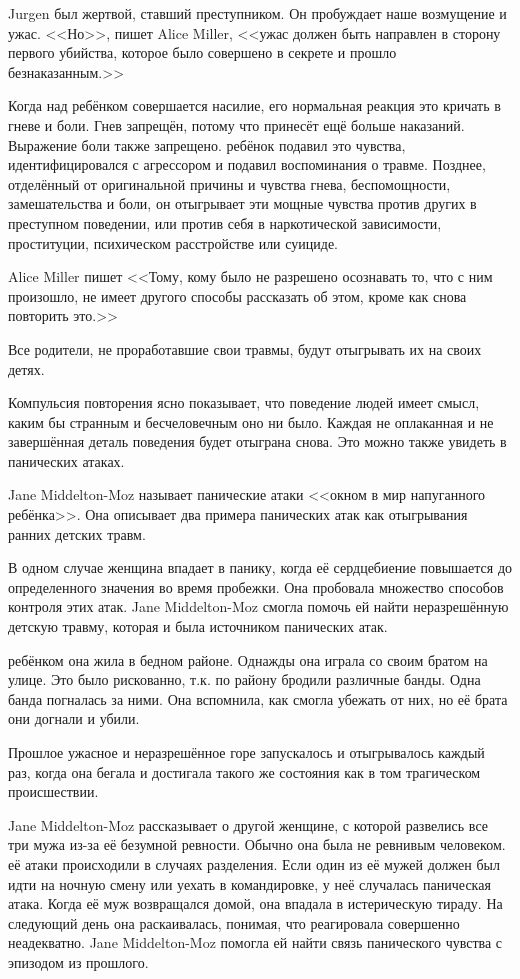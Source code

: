\documentclass[10pt, fleqn]{article}
\begin{document}
Jurgen был жертвой, ставший преступником. Он пробуждает наше возмущение и ужас. <<Но>>, пишет Alice Miller, <<ужас должен быть направлен в сторону первого убийства, которое было совершено в секрете и прошло безнаказанным.>>

Когда над ребёнком совершается насилие, его нормальная реакция это кричать в гневе и боли. Гнев запрещён, потому что принесёт ещё больше наказаний. Выражение боли также запрещено. ребёнок подавил это чувства, идентифицировался с агрессором и подавил воспоминания о травме. Позднее, отделённый от оригинальной причины и чувства гнева, беспомощности, замешательства и боли, он отыгрывает эти мощные чувства против других в преступном поведении, или против себя в наркотической зависимости, проституции, психическом расстройстве или суициде.

Alice Miller пишет <<Тому, кому было не разрешено осознавать то, что с ним произошло, не имеет другого способы рассказать об этом, кроме как снова повторить это.>>

Все родители, не проработавшие свои травмы, будут отыгрывать их на своих детях.


Компульсия повторения ясно показывает, что поведение людей имеет смысл, каким бы странным и бесчеловечным оно ни было. Каждая не оплаканная и не завершённая деталь поведения будет отыграна снова. Это можно также увидеть в панических атаках.

Jane Middelton-Moz называет панические атаки <<окном в мир напуганного ребёнка>>. Она описывает два примера панических атак как отыгрывания ранних детских травм.

В одном случае женщина впадает в панику, когда её сердцебиение повышается до определенного значения во время пробежки. Она пробовала множество способов контроля этих атак. Jane Middelton-Moz смогла помочь ей найти неразрешённую детскую травму, которая и была источником панических атак.

ребёнком она жила в бедном районе. Однажды она играла со своим братом на улице. Это было рискованно, т.к. по району бродили различные банды. Одна банда погналась за ними. Она вспомнила, как смогла убежать от них, но её брата они догнали и убили.

Прошлое ужасное и неразрешённое горе запускалось и отыгрывалось каждый раз, когда она бегала и достигала такого же состояния как в том трагическом происшествии.

Jane Middelton-Moz рассказывает о другой женщине, с которой развелись все три мужа из-за её безумной ревности. Обычно она была не ревнивым человеком. её атаки происходили в случаях разделения. Если один из её мужей должен был идти на ночную смену или уехать в командировке, у неё случалась паническая атака. Когда её муж возвращался домой, она впадала в истерическую тираду. На следующий день она раскаивалась, понимая, что реагировала совершенно неадекватно. Jane Middelton-Moz помогла ей найти связь панического чувства с эпизодом из прошлого.
\end{document}
